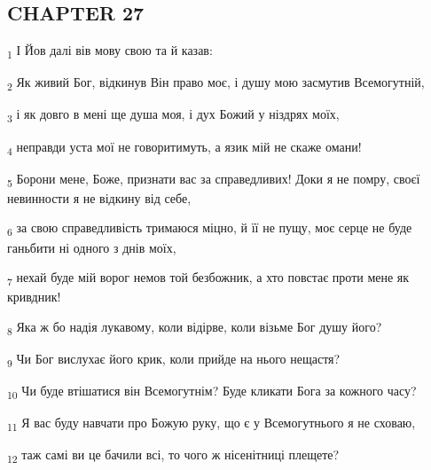 \subsection{CHAPTER 27}
\begin{tcolorbox}
\textsubscript{1} І Йов далі вів мову свою та й казав:
\end{tcolorbox}
\begin{tcolorbox}
\textsubscript{2} Як живий Бог, відкинув Він право моє, і душу мою засмутив Всемогутній,
\end{tcolorbox}
\begin{tcolorbox}
\textsubscript{3} і як довго в мені ще душа моя, і дух Божий у ніздрях моїх,
\end{tcolorbox}
\begin{tcolorbox}
\textsubscript{4} неправди уста мої не говоритимуть, а язик мій не скаже омани!
\end{tcolorbox}
\begin{tcolorbox}
\textsubscript{5} Борони мене, Боже, признати вас за справедливих! Доки я не помру, своєї невинности я не відкину від себе,
\end{tcolorbox}
\begin{tcolorbox}
\textsubscript{6} за свою справедливість тримаюся міцно, й її не пущу, моє серце не буде ганьбити ні одного з днів моїх,
\end{tcolorbox}
\begin{tcolorbox}
\textsubscript{7} нехай буде мій ворог немов той безбожник, а хто повстає проти мене як кривдник!
\end{tcolorbox}
\begin{tcolorbox}
\textsubscript{8} Яка ж бо надія лукавому, коли відірве, коли візьме Бог душу його?
\end{tcolorbox}
\begin{tcolorbox}
\textsubscript{9} Чи Бог вислухає його крик, коли прийде на нього нещастя?
\end{tcolorbox}
\begin{tcolorbox}
\textsubscript{10} Чи буде втішатися він Всемогутнім? Буде кликати Бога за кожного часу?
\end{tcolorbox}
\begin{tcolorbox}
\textsubscript{11} Я вас буду навчати про Божую руку, що є у Всемогутнього я не сховаю,
\end{tcolorbox}
\begin{tcolorbox}
\textsubscript{12} таж самі ви це бачили всі, то чого ж нісенітниці плещете?
\end{tcolorbox}
